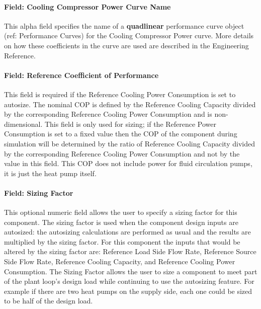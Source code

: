 \paragraph{Field: Cooling Compressor Power Curve Name}\label{field-cooling-compressor-power-curve-name}

This alpha field specifies the name of a \textbf{quadlinear} performance curve object (ref: Performance Curves) for the Cooling Compressor Power curve. More details on how these coefficients in the curve are used are described in the Engineering Reference.

\paragraph{Field: Reference Coefficient of Performance}\label{field-cooling-nom-COP}

This field is required if the Reference Cooling Power Consumption is set to autosize.  The nominal COP is defined by the Reference Cooling Capacity divided by the corresponding Reference Cooling Power Consumption and is non-dimensional.  This field is only used for sizing; if the Reference Power Consumption is set to a fixed value then the COP of the component during simulation will be determined by the ratio of Reference Cooling Capacity divided by the corresponding Reference Cooling Power Consumption and not by the value in this field. This COP does not include power for fluid circulation pumps, it is just the heat pump itself.

\paragraph{Field: Sizing Factor}\label{field-cooling-siz-fac}

This optional numeric field allows the user to specify a sizing factor for this component. The
sizing factor is used when the component design inputs are autosized: the autosizing calculations
are performed as usual and the results are multiplied by the sizing factor. For this component
the inputs that would be altered by the sizing factor are: Reference Load Side Flow Rate, Reference Source Side Flow Rate, Reference Cooling Capacity, and Reference Cooling Power Consumption. The Sizing Factor allows the user to size
a component to meet part of the plant loop's design load while continuing to use the autosizing feature.  For example if there are two heat pumps on the supply side, each one could be sized to be half of the design load.

